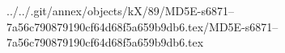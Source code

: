 ../../.git/annex/objects/kX/89/MD5E-s6871--7a56c790879190cf64d68f5a659b9db6.tex/MD5E-s6871--7a56c790879190cf64d68f5a659b9db6.tex